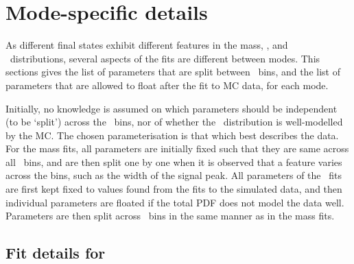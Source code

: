 \section{Mode-specific details}
\label{chap:prod:fitting:details}

As different final states exhibit different features in the mass, \deltam, and 
\lnipchisq\ distributions, several aspects of the fits are different between 
modes.
This sections gives the list of parameters that are split between \pTy\ bins, 
and the list of parameters that are allowed to float after the fit to \ac{MC} 
data, for each mode.

Initially, no knowledge is assumed on which parameters should be independent 
(to be `split') across the \pTy\ bins, nor of whether the \lnipchisq\ 
distribution is well-modelled by the \ac{MC}.
The chosen parameterisation is that which best describes the data.
For the mass fits, all parameters are initially fixed such that they are same 
across all \pTy\ bins, and are then split one by one when it is observed that a 
feature varies across the bins, such as the width of the signal peak.
All parameters of the \lnipchisq\ fits are first kept fixed to values found 
from the fits to the simulated data, and then individual parameters are floated 
if the total PDF does not model the data well.
Parameters are then split across \pTy\ bins in the same manner as in the mass 
fits.

\subsection{Fit details for \PDzero}
\label{chap:prod:fitting:details:D0ToKpi}

